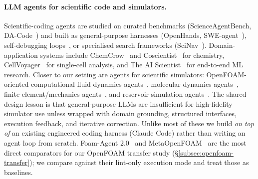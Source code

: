 \documentclass{article}
\begin{document}
\paragraph{LLM agents for scientific code and simulators.}
Scientific-coding agents are studied on curated benchmarks (ScienceAgentBench, DA-Code~\cite{chen2024scienceagentbench,huang2024dacode}) and built as general-purpose harnesses (OpenHands, SWE-agent~\cite{wang2024openhands,yang2024sweagent}), self-debugging loops~\cite{chen2024selfdebug}, or specialised search frameworks (SciNav~\cite{zhang2026scinav}). Domain-application systems include ChemCrow~\cite{bran2024chemcrow} and Coscientist~\cite{boiko2023coscientist} for chemistry, CellVoyager~\cite{alber2025cellvoyager} for single-cell analysis, and The AI Scientist~\cite{lu2024aiscientist,yamada2025ai} for end-to-end ML research. Closer to our setting are agents for scientific simulators: OpenFOAM-oriented computational fluid dynamics agents~\cite{chen2024metaopenfoam,pandey2025openfoamgpt,foamagent2025}, molecular-dynamics agents~\cite{kim2024mdagents,shi2026mdagent2,guilbert2025dynamate,zhao2026polyjarvis}, finite-element/mechanics agents~\cite{zhan2025mooseagent,ni2024mechagents}, and reservoir-simulation agents~\cite{moyner2026jutulgpt}. The shared design lesson is that general-purpose LLMs are insufficient for high-fidelity simulator use unless wrapped with domain grounding, structured interfaces, execution feedback, and iterative correction. Unlike most of these we build \emph{on top of} an existing engineered coding harness (Claude Code) rather than writing an agent loop from scratch. Foam-Agent 2.0~\cite{foamagent2025} and MetaOpenFOAM~\cite{chen2024metaopenfoam} are the most direct comparators for our OpenFOAM transfer study (\S\ref{subsec:openfoam-transfer}); we compare against their lint-only execution mode and treat those as baselines.
\end{document}
